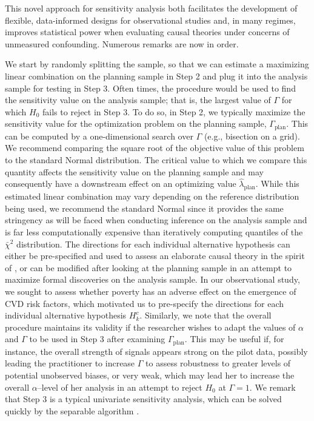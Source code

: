 \documentclass[12pt,leqno,titlepage]{amsart}
\newcommand{\1}{\mathbbm{1}}
\newcommand{\p}{\text{plan}}
\begin{document}
\begin{bibunit}
This novel approach for sensitivity analysis both facilitates the development of flexible, data-informed designs for observational studies and, in many regimes, improves statistical power when evaluating causal theories under concerns of unmeasured confounding. Numerous remarks are now in order.

We start by randomly splitting the sample, so that we can estimate a maximizing linear combination on the planning sample in Step 2 and plug it into the analysis sample for testing in Step 3.  Often times, the procedure would be used to find the sensitivity value on the analysis sample; that is, the largest value of $\Gamma$ for which $H_0$ fails to reject in Step 3. To do so, in Step 2, we typically maximize the sensitivity value for the optimization problem on the planning sample, $\Gamma_\p$. This can be computed by a one-dimensional search over $\Gamma$ (e.g., bisection on a grid). We recommend comparing the square root of the objective value of this problem to the standard Normal distribution. The critical value to which we compare this quantity affects the sensitivity value on the planning sample and may consequently have a downstream effect on an optimizing value $\widehat{{\lambda}}_\p$. While this estimated linear combination may vary depending on the reference distribution being used, we recommend the standard Normal since it provides the same stringency as will be faced when conducting inference on the analysis sample and is far less computationally expensive than iteratively computing quantiles of the $\bar{\chi}^2$ distribution. The directions for each individual alternative hypothesis can either be pre-specified and used to assess an elaborate causal theory in the spirit of \cite{cochran1965planning}, or can be modified after looking at the planning sample in an attempt to maximize formal discoveries on the analysis sample.
In our observational study, we sought to assess whether poverty has an adverse effect on the emergence of CVD risk factors, which motivated us to pre-specify the directions for each individual alternative hypothesis $H_k^c$. Similarly, we note that the overall procedure maintains its validity if the researcher wishes to adapt the values of $\alpha$ and $\Gamma$ to be used in Step 3 after examining $\Gamma_\p$. This may be useful if, for instance, the overall strength of signals appears strong on the pilot data, possibly leading the practitioner to increase $\Gamma$ to assess robustness to greater levels of potential unobserved biases, or very weak, which may lead her to increase the overall $\alpha$--level of her analysis in an attempt to reject $H_0$ at $\Gamma=1$. We remark that Step 3 is a typical univariate sensitivity analysis, which can be solved quickly by the separable algorithm \citep{gastwirth2000asymptotic}.


\end{bibunit}
\end{document}
